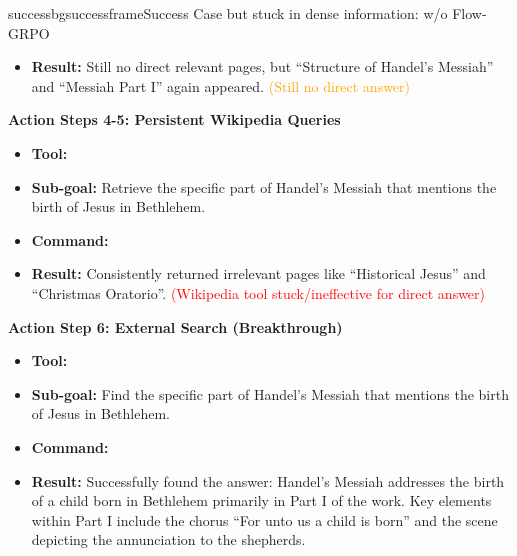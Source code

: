 \begin{small}
\begin{center}
\begin{casebox}{successbg}{successframe}{Success Case but stuck in dense information: \model w/o Flow-GRPO}
\begin{itemize}[nosep, leftmargin=*]
        \item \textbf{Result:} Still no direct relevant pages, but ``Structure of Handel's Messiah'' and ``Messiah Part I'' again appeared. \textcolor{orange}{(Still no direct answer)}
    \end{itemize}

    \vspace{1em}

    \textbf{Action Steps 4-5: Persistent Wikipedia Queries}
    \begin{itemize}[nosep, leftmargin=*]
        \item \textbf{Tool:} 
        \item \textbf{Sub-goal:} Retrieve the specific part of Handel's Messiah that mentions the birth of Jesus in Bethlehem.
        \item \textbf{Command:}

             
        \item \textbf{Result:} Consistently returned irrelevant pages like ``Historical Jesus'' and ``Christmas Oratorio''. \textcolor{red}{(Wikipedia tool stuck/ineffective for direct answer)}
    \end{itemize}

    \vspace{1em}

    \textbf{Action Step 6: External Search (Breakthrough)}
    \begin{itemize}[nosep, leftmargin=*]
        \item \textbf{Tool:} 
        \item \textbf{Sub-goal:} Find the specific part of Handel's Messiah that mentions the birth of Jesus in Bethlehem.
        \item \textbf{Command:}

        \item \textbf{Result:} {Successfully found the answer: Handel's Messiah addresses the birth of a child born in Bethlehem primarily in Part I of the work. Key elements within Part I include the chorus ``For unto us a child is born'' and the scene depicting the annunciation to the shepherds.}
    \end{itemize}


\end{casebox}
\end{center}
\end{small}
